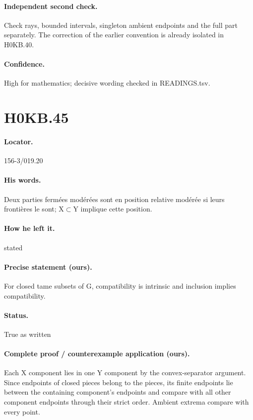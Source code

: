 \paragraph{Independent second check.} Check rays, bounded intervals, singleton ambient endpoints and the full part separately. The correction of the earlier convention is already isolated in H0KB.40.

\paragraph{Confidence.} High for mathematics; decisive wording checked in READINGS.tsv.

\section*{H0KB.45}\label{statement:H0KB.45}
\paragraph{Locator.} 156-3/019.20

\paragraph{His words.} Deux parties fermées modérées sont en position relative modérée si leurs frontières le sont; X\ensuremath{\subset}Y implique cette position.

\paragraph{How he left it.} stated

\paragraph{Precise statement (ours).} For closed tame subsets of G, compatibility is intrinsic and inclusion implies compatibility.

\paragraph{Status.} True as written

\paragraph{Complete proof / counterexample application (ours).} Each X component lies in one Y component by the convex-separator argument. Since endpoints of closed pieces belong to the pieces, its finite endpoints lie between the containing component’s endpoints and compare with all other component endpoints through their strict order. Ambient extrema compare with every point.

